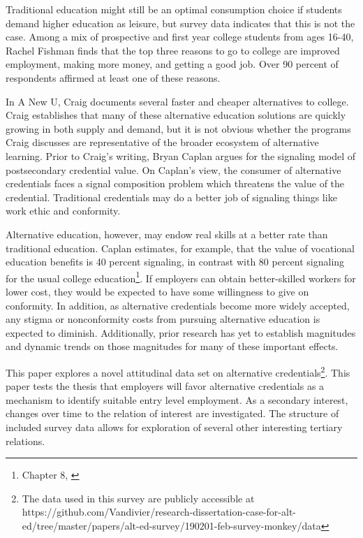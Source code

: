 \documentclass[AER]{/Users/zyl357/Documents/GitHub/research-dissertation-case-for-alt-ed/papers/alt-ed-survey/aea-latex-templates/AEA}
\begin{document}
Traditional education might still be an optimal consumption choice if
students demand higher education as leisure, but survey data indicates
that this is not the case. Among a mix of prospective and first year
college students from ages 16-40\cite{fishman_2015}, Rachel Fishman finds that the top three
reasons to go to college are improved employment, making more money, and
getting a good job. Over 90 percent of respondents affirmed at least one of these
reasons.

In A New U, Craig documents several faster and cheaper alternatives to
college\cite{craig_2018}. Craig establishes that many of these alternative education
solutions are quickly growing in both supply and demand, but it is not
obvious whether the programs Craig discusses are representative of the
broader ecosystem of alternative learning. Prior to Craig’s writing, Bryan
Caplan argues for the signaling model of postsecondary credential value\cite{caplan2018case}.
On Caplan’s view, the consumer of alternative credentials faces a signal
composition problem which threatens the value of the credential.
Traditional credentials may do a better job of signaling things like work
ethic and conformity.

Alternative education, however, may endow real skills at a better rate
than traditional education. Caplan estimates, for example, that the value
of vocational education benefits is 40 percent signaling, in contrast with 80 percent
signaling for the usual college education\footnote{Chapter 8, \cite{caplan2018case}}. If employers can obtain
better-skilled workers for lower cost, they would be expected to have some
willingness to give on conformity. In addition, as alternative credentials
become more widely accepted, any stigma or nonconformity costs from
pursuing alternative education is expected to diminish. Additionally,
prior research has yet to establish magnitudes and dynamic trends on those
magnitudes for many of these important effects.

This paper explores a novel attitudinal data set on alternative
credentials\footnote{ The data used in this survey are publicly accessible
at https://github.com/Vandivier/research-dissertation-case-for-alt-ed/tree/master/papers/alt-ed-survey/190201-feb-survey-monkey/data}.
This paper tests the thesis that employers will favor
alternative credentials as a mechanism to identify suitable entry level
employment. As a secondary interest, changes over time to the relation of
interest are investigated. The structure of included survey data allows
for exploration of several other interesting tertiary relations.
\end{document}
